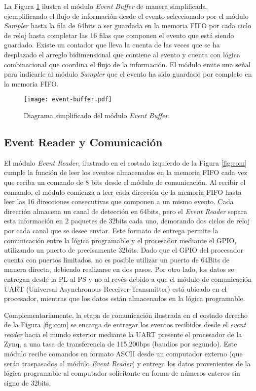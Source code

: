 	La Figura \ref{fig:event-buffer} ilustra el módulo \textit{Event Buffer} de manera simplificada, ejemplificando el flujo de información desde el evento seleccionado por el módulo \textit{Sampler} hasta la fila de 64bits a ser guardada en la memoria FIFO por cada ciclo de reloj hasta completar las 16 filas que componen el evento que está siendo guardado. Existe un contador que lleva la cuenta de las veces que se ha desplazado el arreglo bidimensional que contiene al evento y cuenta con lógica combinacional que coordina el flujo de la información. El módulo emite una señal para indicarle al módulo \textit{Sampler} que el evento ha sido guardado por completo en la memoria FIFO.
	
	\begin{figure}[H]
		\centering
		\texttt{[image: event-buffer.pdf]}
		\caption{Diagrama simplificado del módulo \textit{Event Buffer}.}
		\label{fig:event-buffer}
	\end{figure}
	
	\subsection{Event Reader y Comunicación}
	\label{sec:comm}
	El módulo \textit{Event Reader}, ilustrado en el costado izquierdo de la Figura \ref{fig:com} cumple la función de leer los eventos almacenados en la memoria FIFO cada vez que reciba un comando de 8 bits desde el módulo de comunicación. Al recibir el comando, el módulo comienza a leer cada dirección de la memoria FIFO hasta leer las 16 direcciones consecutivas que componen a un mismo evento. Cada dirección almacena un canal de detección en 64bits, pero el \textit{Event Reader} separa esta información en 2 paquetes de 32bits cada uno, demorando dos ciclos de reloj por cada canal que se desee enviar. Este formato de entrega permite la comunicación entre la lógica programable y el procesador mediante el GPIO, utilizando un puerto de precisamente 32bits. Dado que el GPIO del procesador cuenta con puertos limitados, no es posible utilizar un puerto de 64Bits de manera directa, debiendo realizarse en dos pasos. Por otro lado, los datos se entregan desde la PL al PS y no al revés debido a que el módulo de comunicación UART (Universal Asynchronous Receiver-Transmitter) está ubicado en el procesador, mientras que los datos están almacenados en la lógica programable.
	 
	Complementariamente, la etapa de comunicación ilustrada en el costado derecho de la Figura \ref{fig:com} se encarga de entregar los eventos recibidos desde el \textit{event reader} hacia el mundo exterior mediante la UART presente el procesador de la Zynq, a una tasa de transferencia de 115.200bps (baudios por segundo). Este módulo recibe comandos en formato ASCII desde un computador externo (que serán traspasados al módulo \textit{Event Reader}) y entrega los datos provenientes de la lógica programable al computador solicitante en forma de números enteros sin signo de 32bits.
	
